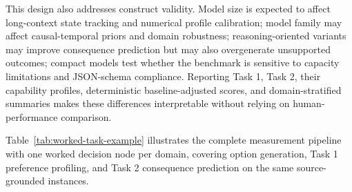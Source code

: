 \documentclass[pdflatex,sn-mathphys-num]{sn-jnl}%
\theoremstyle{thmstyleone}%
\theoremstyle{thmstyletwo}%
\theoremstyle{thmstylethree}%
\begin{document}
This design also addresses construct validity. Model size is expected to affect long-context state tracking and numerical profile calibration; model family may affect causal-temporal priors and domain robustness; reasoning-oriented variants may improve consequence prediction but may also overgenerate unsupported outcomes; compact models test whether the benchmark is sensitive to capacity limitations and JSON-schema compliance. Reporting Task 1, Task 2, their capability profiles, deterministic baseline-adjusted scores, and domain-stratified summaries makes these differences interpretable without relying on human-performance comparison.

Table~\ref{tab:worked-task-example} illustrates the complete measurement pipeline with one worked decision node per domain, covering option generation, Task 1 preference profiling, and Task 2 consequence prediction on the same source-grounded instances.
\end{document}
